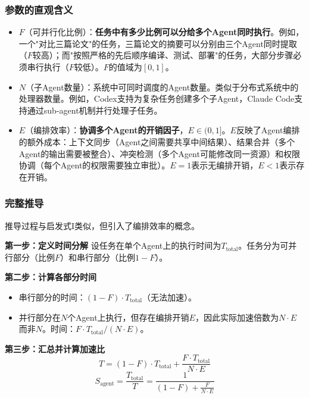 \subsubsection{参数的直观含义}

\begin{itemize}[nosep]
\item $F$（可并行化比例）：\textbf{任务中有多少比例可以分给多个Agent同时执行}。例如，一个"对比三篇论文"的任务，三篇论文的摘要可以分别由三个Agent同时提取（$F$较高）；而"按照严格的先后顺序编译、测试、部署"的任务，大部分步骤必须串行执行（$F$较低）。$F$的值域为$[0, 1]$。

\item $N$（子Agent数量）：系统中可同时调度的Agent数量。类似于分布式系统中的处理器数量。例如，Codex支持为复杂任务创建多个子Agent，Claude Code支持通过sub-agent机制并行处理子任务\cite{anthropic_claudecode_subagents_2026}。

\item $E$（编排效率）：\textbf{协调多个Agent的开销因子}，$E \in (0, 1]$。$E$反映了Agent编排的额外成本：上下文同步（Agent之间需要共享中间结果）、结果合并（多个Agent的输出需要被整合）、冲突检测（多个Agent可能修改同一资源）和权限协调（每个Agent的权限需要独立审批）。$E = 1$表示无编排开销，$E < 1$表示存在开销。
\end{itemize}

\subsubsection{完整推导}

推导过程与启发式I类似，但引入了编排效率的概念。

\textbf{第一步：定义时间分解}
设任务在单个Agent上的执行时间为$T_{\mathrm{total}}$。任务分为可并行部分（比例$F$）和串行部分（比例$1-F$）。

\textbf{第二步：计算各部分时间}
\begin{itemize}[nosep]
\item 串行部分的时间：$(1-F) \cdot T_{\mathrm{total}}$（无法加速）。
\item 并行部分在$N$个Agent上执行，但存在编排开销$E$，因此实际加速倍数为$N \cdot E$而非$N$。时间：$F \cdot T_{\mathrm{total}} / (N \cdot E)$。
\end{itemize}

\textbf{第三步：汇总并计算加速比}
\begin{equation}
T = (1-F) \cdot T_{\mathrm{total}} + \frac{F \cdot T_{\mathrm{total}}}{N \cdot E}
\end{equation}
\begin{equation}
S_{\mathrm{agent}} = \frac{T_{\mathrm{total}}}{T} = \frac{1}{(1-F) + \frac{F}{N \cdot E}}
\end{equation}

